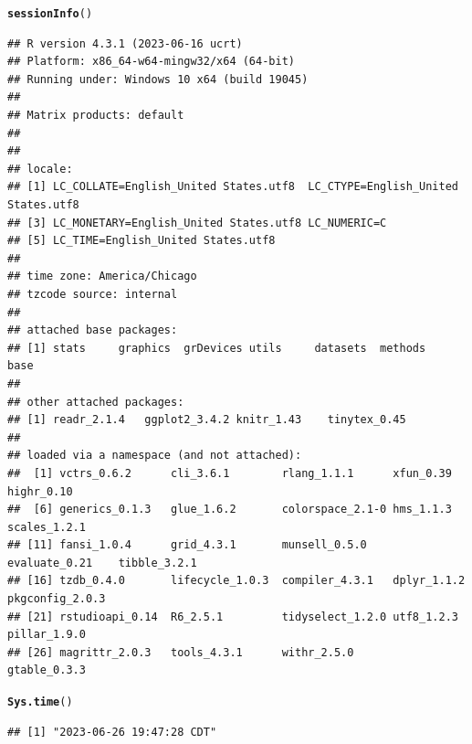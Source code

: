 \documentclass{article}\usepackage[]{graphicx}\usepackage[]{xcolor}
\makeatletter
\newcommand{\hlstd}[1]{\textcolor[rgb]{0.345,0.345,0.345}{#1}}%
\newcommand{\hlkwd}[1]{\textcolor[rgb]{0.737,0.353,0.396}{\textbf{#1}}}%
\newenvironment{kframe}{%
 \def\at@end@of@kframe{}%
 \ifinner\ifhmode%
  \def\at@end@of@kframe{\end{minipage}}%
  \begin{minipage}{\columnwidth}%
 \fi\fi%
 \def\FrameCommand##1{\hskip\@totalleftmargin \hskip-\fboxsep
 \colorbox{shadecolor}{##1}\hskip-\fboxsep
     \hskip-\linewidth \hskip-\@totalleftmargin \hskip\columnwidth}%
 \MakeFramed {\advance\hsize-\width
   \@totalleftmargin\z@ \linewidth\hsize
   \@setminipage}}%
 {\par\unskip\endMakeFramed%
 \at@end@of@kframe}
\newenvironment{knitrout}{}{} %
\makeatother
\begin{document}
\begin{knitrout}
\color{fgcolor}\begin{kframe}
\begin{alltt}
\hlkwd{sessionInfo}\hlstd{()}
\end{alltt}
\begin{verbatim}
## R version 4.3.1 (2023-06-16 ucrt)
## Platform: x86_64-w64-mingw32/x64 (64-bit)
## Running under: Windows 10 x64 (build 19045)
## 
## Matrix products: default
## 
## 
## locale:
## [1] LC_COLLATE=English_United States.utf8  LC_CTYPE=English_United States.utf8   
## [3] LC_MONETARY=English_United States.utf8 LC_NUMERIC=C                          
## [5] LC_TIME=English_United States.utf8    
## 
## time zone: America/Chicago
## tzcode source: internal
## 
## attached base packages:
## [1] stats     graphics  grDevices utils     datasets  methods   base     
## 
## other attached packages:
## [1] readr_2.1.4   ggplot2_3.4.2 knitr_1.43    tinytex_0.45 
## 
## loaded via a namespace (and not attached):
##  [1] vctrs_0.6.2      cli_3.6.1        rlang_1.1.1      xfun_0.39        highr_0.10      
##  [6] generics_0.1.3   glue_1.6.2       colorspace_2.1-0 hms_1.1.3        scales_1.2.1    
## [11] fansi_1.0.4      grid_4.3.1       munsell_0.5.0    evaluate_0.21    tibble_3.2.1    
## [16] tzdb_0.4.0       lifecycle_1.0.3  compiler_4.3.1   dplyr_1.1.2      pkgconfig_2.0.3 
## [21] rstudioapi_0.14  R6_2.5.1         tidyselect_1.2.0 utf8_1.2.3       pillar_1.9.0    
## [26] magrittr_2.0.3   tools_4.3.1      withr_2.5.0      gtable_0.3.3
\end{verbatim}
\begin{alltt}
\hlkwd{Sys.time}\hlstd{()}
\end{alltt}
\begin{verbatim}
## [1] "2023-06-26 19:47:28 CDT"
\end{verbatim}
\end{kframe}
\end{knitrout}
\end{document}
